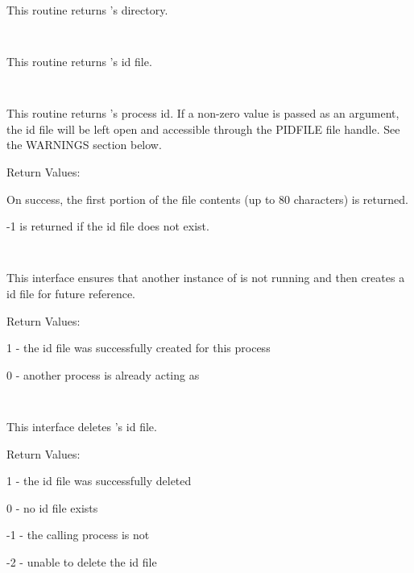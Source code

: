 \begin{description}

\item {}\verb" "

This routine returns 's directory.

\item {}\verb" "

This routine returns 's id file.

\item {}\verb" "

This routine returns 's process id.  If a non-zero value is
passed as an argument, the id file will be left open and accessible through
the PIDFILE file handle.  See the WARNINGS section below.

Return Values:

\begin{description}
\item On success, the first portion of the file contents (up to 80 characters)
is returned.
\item -1 is returned if the id file does not exist.
\end{description}

\item {}\verb" "

This interface ensures that another instance of  is not
running and then creates a id file for future reference.

Return Values:

\begin{description}
\item 1 - the id file was successfully created for this process
\item 0 - another process is already acting as 
\end{description}

\item {}\verb" "

This interface deletes 's id file.

Return Values:

\begin{description}
\item  1 - the id file was successfully deleted
\item  0 - no id file exists
\item -1 - the calling process is not 
\item -2 - unable to delete the id file
\end{description}


\end{description}

